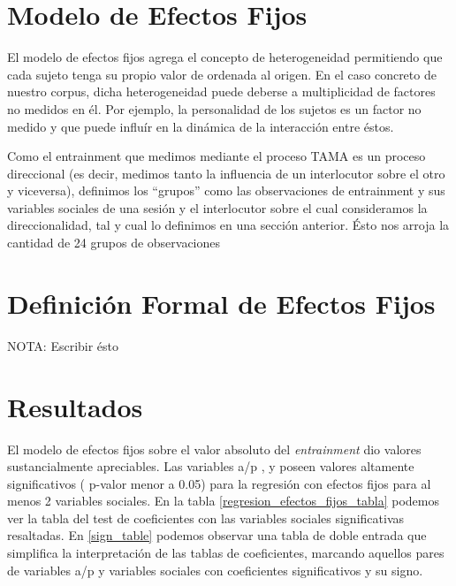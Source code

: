 \section{Modelo de Efectos Fijos}

\newcommand{\slopeestim}[1] { $\estslope \sim #1$ }

El modelo de efectos fijos agrega el concepto de heterogeneidad permitiendo que cada sujeto tenga su propio valor de ordenada al origen. En el caso concreto de nuestro corpus, dicha heterogeneidad puede deberse a multiplicidad de factores no medidos en él. Por ejemplo, la personalidad de los sujetos es un factor no medido y que puede influír en la dinámica de la interacción entre éstos.

Como el entrainment que medimos mediante el proceso TAMA es un proceso direccional (es decir, medimos tanto la influencia de un interlocutor sobre el otro y viceversa), definimos los ``grupos'' como las observaciones de entrainment y sus variables sociales de una sesión y el interlocutor sobre el cual consideramos la direccionalidad, tal y cual lo definimos en una sección anterior. Ésto nos arroja la cantidad de 24 grupos de observaciones



\section{Definición Formal de Efectos Fijos}

NOTA: Escribir ésto

\section{Resultados}

El modelo de efectos fijos sobre el valor absoluto del \emph{entrainment} dio valores sustancialmente apreciables. Las variables a/p \ENGMAX, \FOMEAN y \NOISETOHARMONICS poseen valores altamente significativos ( p-valor menor a 0.05) para la regresión con efectos fijos para al menos 2 variables sociales. En la tabla \ref{regresion_efectos_fijos_tabla} podemos ver la tabla del test de coeficientes con las variables sociales significativas resaltadas. En \ref{sign_table} podemos observar una tabla de doble entrada que simplifica la interpretación de las tablas de coeficientes, marcando aquellos pares de variables a/p y variables sociales con coeficientes significativos y su signo.





